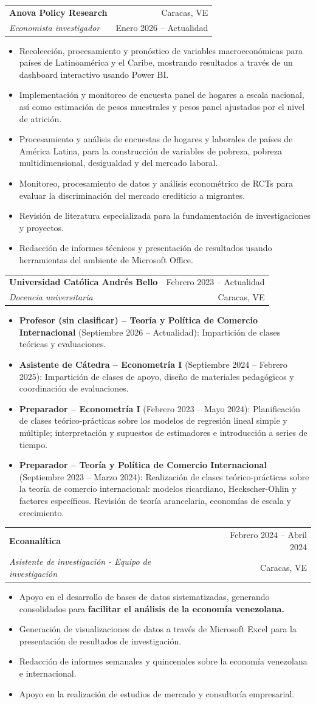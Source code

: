 \documentclass[letterpaper,11pt]{article}
\makeatletter
\newcommand{\resumeItem}[1]{
  \item\small{
    {#1 \vspace{-1pt}}
  }
}
\newcommand{\resumeSubheading}[4]{
  \vspace{-1pt}\item
    \begin{tabular*}{\textwidth}[t]{l@{\extracolsep{\fill}}r}
      \textbf{#1} & {\color{dark-grey}\small #2}\vspace{1pt}\\ %
      \textit{#3} & {\color{dark-grey} \small #4}\\ %
    \end{tabular*}\vspace{-4pt}
}
\newcommand{\resumeItemListStart}{\begin{itemize}}
\newcommand{\resumeItemListEnd}{\end{itemize}\vspace{0pt}}
\makeatother
\begin{document}
    \resumeSubheading
      {Anova Policy Research}{Caracas, VE}      
      {Economista investigador}{Enero 2026 -- Actualidad} 
      \resumeItemListStart
        \resumeItem{Recolección, procesamiento y pronóstico de variables macroeconómicas para países de Latinoamérica y el Caribe, mostrando resultados a través de un dashboard interactivo usando Power BI.}
        \resumeItem{Implementación y monitoreo de encuesta panel de hogares a escala nacional, así como estimación de pesos muestrales y pesos panel ajustados por el nivel de atrición.}
        \resumeItem{Procesamiento y análisis de encuestas de hogares y laborales de países de América Latina, para la construcción de variables de pobreza, pobreza multidimensional, desigualdad y del mercado laboral.}
        \resumeItem{Monitoreo, procesamiento de datos y análisis econométrico de RCTs para evaluar la discriminación del mercado crediticio a migrantes.}
        \resumeItem{Revisión de literatura especializada para la fundamentación de investigaciones y proyectos.}
        \resumeItem{Redacción de informes técnicos y presentación de resultados usando herramientas del ambiente de Microsoft Office.}
      \resumeItemListEnd

    \resumeSubheading
      {Universidad Católica Andrés Bello}{Febrero 2023 -- Actualidad}
      {Docencia universitaria}{Caracas, VE}
      \resumeItemListStart
        \resumeItem{\textbf{Profesor (sin clasificar) -- Teoría y Política de Comercio Internacional} (Septiembre 2026 -- Actualidad): Impartición de clases teóricas y evaluaciones.}
        \resumeItem{\textbf{Asistente de Cátedra -- Econometría I} (Septiembre 2024 -- Febrero 2025): Impartición de clases de apoyo, diseño de materiales pedagógicos y coordinación de evaluaciones.}
        \resumeItem{\textbf{Preparador -- Econometría I} (Febrero 2023 -- Mayo 2024): Planificación de clases teórico-prácticas sobre los modelos de regresión lineal simple y múltiple; interpretación y supuestos de estimadores e introducción a series de tiempo.}
        \resumeItem{\textbf{Preparador -- Teoría y Política de Comercio Internacional} (Septiembre 2023 -- Marzo 2024): Realización de clases teórico-prácticas sobre la teoría de comercio internacional: modelos ricardiano, Heckscher-Ohlin y factores específicos. Revisión de teoría arancelaria, economías de escala y crecimiento.}
      \resumeItemListEnd

    \resumeSubheading
      {Ecoanalítica}{Febrero 2024 -- Abril 2024}
      {Asistente de investigación - Equipo de investigación}{Caracas, VE}
      \resumeItemListStart
        \resumeItem{Apoyo en el desarrollo de bases de datos sistematizadas, generando consolidados para \textbf{facilitar el análisis de la economía venezolana.}}        
        \resumeItem{Generación de visualizaciones de datos a través de Microsoft Excel para la presentación de resultados de investigación.}
        \resumeItem{Redacción de informes semanales y quincenales sobre la economía venezolana e internacional.}
        \resumeItem{Apoyo en la realización de estudios de mercado y consultoría empresarial.}
      \resumeItemListEnd
\end{document}
